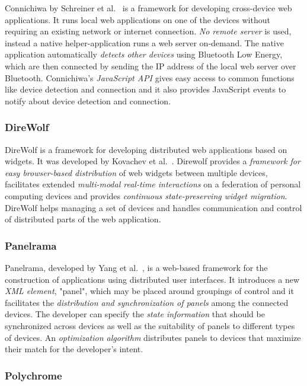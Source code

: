 Connichiwa by Schreiner et al.~\cite{connichiwa2015} is a framework for developing cross-device web applications. It runs local web applications on one of the devices without requiring an existing network or internet connection. \emph{No remote server} is used, instead a native helper-application runs a web server on-demand. The native application automatically \emph{detects other devices} using Bluetooth Low Energy, which are then connected by sending the IP address of the local web server over Bluetooth. Connichiwa's \emph{JavaScript API} gives easy access to common functions like device detection and connection and it also provides JavaScript events to notify about device detection and connection.

\subsubsection{DireWolf}

DireWolf is a framework for developing distributed web applications based on widgets. It was developed by Kovachev et al.~\cite{direwolf2013}. Direwolf provides a \emph{framework for easy browser-based distribution} of web widgets between multiple devices, facilitates extended \emph{multi-modal real-time interactions} on a federation of personal computing devices and provides \emph{continuous state-preserving widget migration}. DireWolf helps managing a set of devices and handles communication and control of distributed parts of the web application. 

\subsubsection{Panelrama}

Panelrama, developed by Yang et al.~\cite{panelrama2014}, is a web-based framework for the construction of applications using distributed user interfaces. It introduces a new \emph{XML element}, "panel", which may be placed around groupings of control and it facilitates the \emph{distribution and synchronization of panels} among the connected devices. The developer can specify the \emph{state information} that should be synchronized across devices as well as the suitability of panels to different types of devices. An \emph{optimization algorithm} distributes panels to devices that maximize their match for the developer's intent.

\subsubsection{Polychrome}


